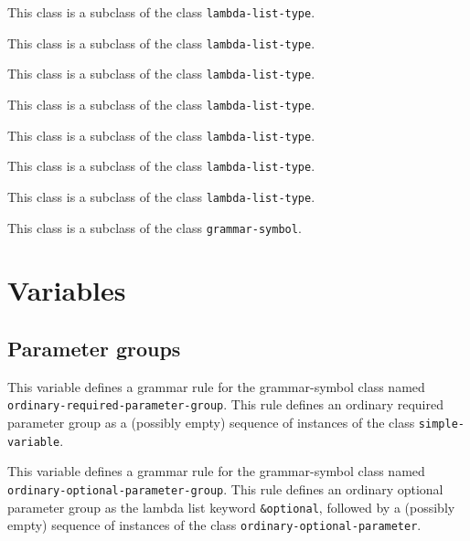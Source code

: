 This class is a subclass of the class \texttt{lambda-list-type}.


This class is a subclass of the class \texttt{lambda-list-type}.


This class is a subclass of the class \texttt{lambda-list-type}.


This class is a subclass of the class \texttt{lambda-list-type}.


This class is a subclass of the class \texttt{lambda-list-type}.


This class is a subclass of the class \texttt{lambda-list-type}.


This class is a subclass of the class \texttt{lambda-list-type}.


This class is a subclass of the class \texttt{grammar-symbol}.

\section{Variables}

\subsection{Parameter groups}


This variable defines a grammar rule for the grammar-symbol class
named \texttt{ordinary-required-parameter-group}.  This rule defines
an ordinary required parameter group as a (possibly empty) sequence of
instances of the class \texttt{simple-variable}.


This variable defines a grammar rule for the grammar-symbol class
named \texttt{ordinary-optional-parameter-group}.  This rule defines
an ordinary optional parameter group as the lambda list keyword
\texttt{\&optional}, followed by a (possibly empty) sequence of
instances of the class \texttt{ordinary-optional-parameter}.

